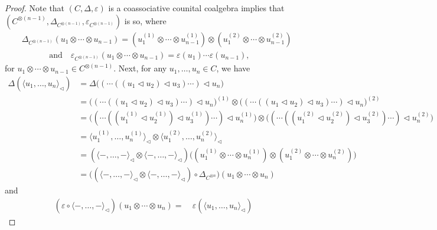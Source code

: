\documentclass[a4paper,reqno,10pt]{amsart}
\theoremstyle{plain}
\theoremstyle{definition}
\theoremstyle{remark}
\begin{document}
\begin{proof} Note that $(C, \Delta, \varepsilon)$ is a coassociative counital coalgebra implies that $(C^{\otimes (n-1)}, \Delta_{C^{\otimes (n-1)}}, \varepsilon_{C^{\otimes (n-1)}})$ is so, where
    \begin{align*}
       & \Delta_{C^{\otimes (n-1)}} (u_1 \otimes \cdots \otimes u_{n-1}) = (u_1^{(1)} \otimes \cdots \otimes u^{(1)}_{n-1}) \otimes (u_1^{(2)} \otimes \cdots \otimes u^{(2)}_{n-1}) \\
       & \quad \qquad \text{ and }  ~~~  \varepsilon_{C^{\otimes (n-1)}}  (u_1 \otimes \cdots \otimes u_{n-1}) = \varepsilon (u_1) \cdots \varepsilon (u_{n-1}),
    \end{align*}
    for $u_1 \otimes \cdots \otimes u_{n-1} \in C^{\otimes (n-1)}$. Next, for any $u_1, \ldots, u_n \in C$, we have
    \begin{align*}
        \Delta (\langle u_1, \ldots, u_n \rangle_\triangleleft) 
        &= \Delta  \big( ( \cdots  ((u_1 \triangleleft u_2) \triangleleft u_3) \cdots) \triangleleft u_n    \big) \\
        &= \big( ( \cdots  ((u_1 \triangleleft u_2) \triangleleft u_3) \cdots) \triangleleft u_n \big)^{(1)} \otimes \big(  ( \cdots  ((u_1 \triangleleft u_2) \triangleleft u_3) \cdots) \triangleleft u_n  \big)^{(2)} \\
        &= \big( ( \cdots  ((u_1^{(1)} \triangleleft u_2^{(1)}) \triangleleft u_3^{(1)}) \cdots) \triangleleft u_n^{(1)} \big) \otimes \big(  ( \cdots  ((u_1^{(2)} \triangleleft u_2^{(2)}) \triangleleft u_3^{(2)}) \cdots) \triangleleft u_n^{(2)}  \big) \\
        &= \langle u_1^{(1)}, \ldots, u_n^{(1)} \rangle_\triangleleft \otimes \langle u_1^{(2)}, \ldots, u_n^{(2)} \rangle_\triangleleft \\
        &= (\langle - , \ldots, - \rangle_\triangleleft \otimes \langle - , \ldots, - \rangle_\triangleleft) \big( (u_1^{(1)} \otimes \cdots \otimes u_n^{(1)})  \otimes  (u_1^{(2)} \otimes \cdots \otimes u_n^{(2)})   \big) \\
        &= \big( (\langle - , \ldots, - \rangle_\triangleleft \otimes \langle - , \ldots, - \rangle_\triangleleft) \circ \Delta_{C^{\otimes n}} \big) (u_1 \otimes \cdots \otimes  u_n)
    \end{align*}
    and 
    \begin{align*}
        (\varepsilon \circ \langle - , \ldots, - \rangle_\triangleleft ) (u_1 \otimes \cdots \otimes u_n) =~& \varepsilon (\langle u_1, \ldots, u_n \rangle_\triangleleft) 

\end{align*}
\end{proof}
\end{document}
